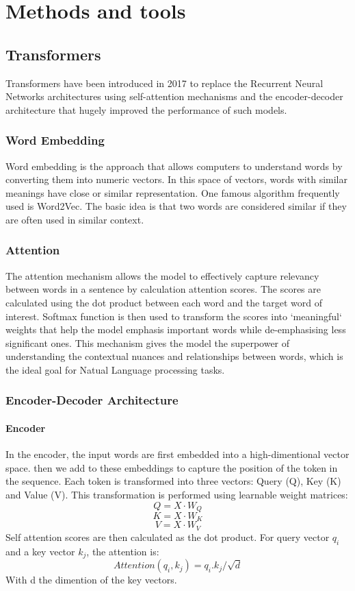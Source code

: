 \documentclass[a4paper,12pt,twoside]{report}
\begin{document}
\chapter{Methods and tools}
\thispagestyle{empty}
\section{Transformers}
Transformers\cite{NIPS2017_3f5ee243} have been introduced in 2017 to replace the Recurrent Neural Networks architectures using self-attention mechanisms and the encoder-decoder architecture that hugely improved the performance of such models.

\subsection{Word Embedding}
Word embedding is the approach that allows computers to understand words by converting them into numeric vectors. In this space of vectors, words with similar meanings have close or similar representation. One famous algorithm frequently used is Word2Vec\cite{mikolov2013efficient}. The basic idea is that two words are considered similar if they are often used in similar context.

\subsection{Attention}
The attention mechanism allows the model to effectively capture relevancy between words in a sentence by calculation attention scores. The scores are calculated using the dot product between each word and the target word of interest. Softmax function is then used to transform the scores into `meaningful` weights that help the model emphasis important words while de-emphasising less significant ones. This mechanism gives the model the superpower of understanding the contextual nuances and relationships between words, which is the ideal goal for Natual Language processing tasks.


\subsection{Encoder-Decoder Architecture}
\subsubsection{Encoder}
In the encoder, the input words are first embedded into a high-dimentional vector space. then we add to these embeddings to capture the position of the token in the sequence. Each token is transformed into three vectors: Query (Q), Key (K) and Value (V). This transformation is performed using learnable weight matrices:
$$Q = X \cdot W_{Q}$$
$$K = X \cdot W_{K}$$
$$V = X \cdot W_{V}$$
Self attention scores are then calculated as the dot product. For query vector $q_{i}$ and a key vector $k_{j}$, the attention is: 
$$Attention(q_{i},k_{j}) = q_{i} . k_{j} / \sqrt{d}$$ 
With d the dimention of the key vectors.
\end{document}
